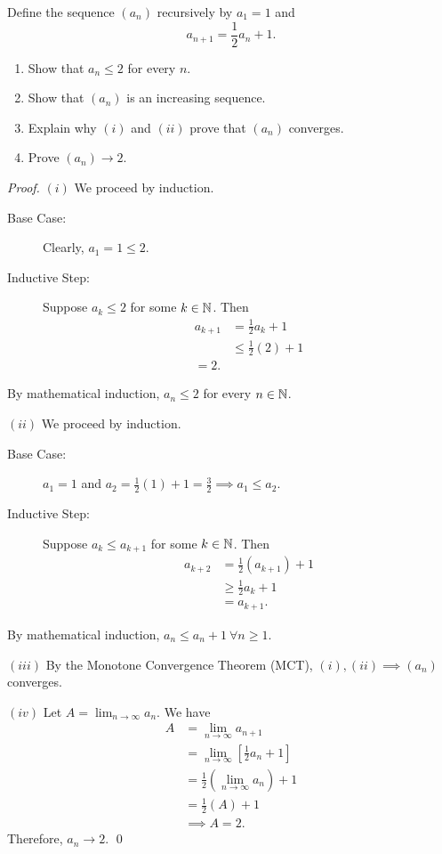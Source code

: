 \begin{example}
    Define the sequence $(a_n)$ recursively by $a_1 = 1$ and
    $$a_{n+1} = \frac{1}{2}a_n + 1.$$
    \begin{enumerate}[($i$)]
        \item Show that $a_n \leq 2$ for every $n$.
        \item Show that $(a_n)$ is an increasing sequence.
        \item Explain why $(i)$ and $(ii)$ prove that $(a_n)$ converges.
        \item Prove $(a_n) \to 2.$
    \end{enumerate}
\end{example}
\begin{proof}
    $(i)$ We proceed by induction.
    \begin{description}
        \item[Base Case:] Clearly, $a_1=1 \leq 2$.
        \item[Inductive Step:] Suppose $a_k \leq 2$ for some $k\in \mathbb{N}$. Then \begin{align*}
            a_{k+1} &= \frac{1}{2}a_k + 1 \\
            &\leq \frac{1}{2}(2) + 1 \\
            = 2.
        \end{align*}
    \end{description}
    By mathematical induction, $a_n \leq 2$ for every $n\in \mathbb{N}$.\newline

    $(ii)$ We proceed by induction.
    \begin{description}
        \item[Base Case:] $a_1 = 1$ and $a_2 = \frac{1}{2}(1) + 1 = \frac{3}{2} \implies a_1 \leq a_2$.
        \item[Inductive Step:] Suppose $a_k \leq a_{k+1}$ for some $k \in \mathbb{N}$. Then
        \begin{align*}
            a_{k+2} &= \frac{1}{2}(a_{k+1}) + 1 \\
            &\geq \frac{1}{2}a_k + 1 \\
            &= a_{k+1}.
        \end{align*}  
    \end{description}
    By mathematical induction, $a_n \leq a_n+1 ~\forall n \geq 1.$ \newline

    $(iii)$ By the Monotone Convergence Theorem (MCT), $(i),(ii) \implies (a_n)$ converges.
    \newline

    $(iv)$ Let $A= \lim_{n\to \infty}a_n.$ We have
    \begin{align*}
        A &= \lim_{n\to\infty}a_{n+1} \\
        &= \lim_{n\to \infty}[\frac{1}{2}a_n + 1] \\
        &= \frac{1}{2}(\lim_{n\to \infty}a_n) + 1 \\
        &= \frac{1}{2}(A) + 1 \\
        &\implies A = 2.
    \end{align*}
    Therefore, $a_n \to 2$.
    \qed
\end{proof}
